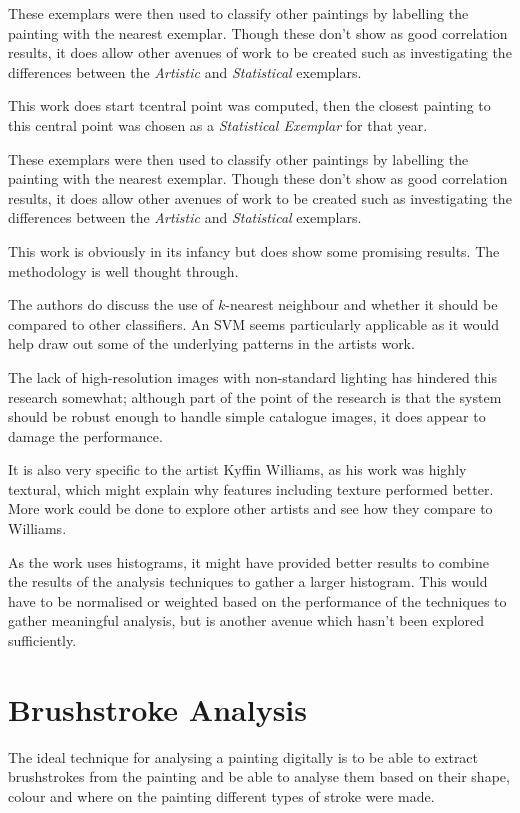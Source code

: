 \documentclass[conference]{IEEEtran}
\begin{document}
These exemplars were then used to classify other paintings by labelling the
painting with the nearest exemplar. Though these don't show as good correlation
results, it does allow other avenues of work to be created such as
investigating the differences between the \emph{Artistic} and
\emph{Statistical} exemplars.

This work does start tcentral point was computed, then the closest painting to
this central point was chosen as a \emph{Statistical Exemplar} for that year.

These exemplars were then used to classify other paintings by labelling the
painting with the nearest exemplar. Though these don't show as good correlation
results, it does allow other avenues of work to be created such as
investigating the differences between the \emph{Artistic} and
\emph{Statistical} exemplars.

This work is obviously in its infancy but does show some promising results. The
methodology is well thought through.

The authors do discuss the use of $k$-nearest neighbour and whether it should
be compared to other classifiers. An \gls{SVM} seems particularly applicable as
it would help draw out some of the underlying patterns in the artists work.

The lack of high-resolution images with non-standard lighting has hindered this
research somewhat; although part of the point of the research is that the
system should be robust enough to handle simple catalogue images, it does
appear to damage the performance.

It is also very specific to the artist Kyffin Williams, as his work was highly
textural, which might explain why features including texture performed better.
More work could be done to explore other artists and see how they compare to
Williams.

As the work uses histograms, it might have provided better results to combine
the results of the analysis techniques to gather a larger histogram. This would
have to be normalised or weighted based on the performance of the techniques to
gather meaningful analysis, but is another avenue which hasn't been explored
sufficiently.

\section{Brushstroke Analysis}

The ideal technique for analysing a painting digitally is to be able to extract
brushstrokes from the painting and be able to analyse them based on their
shape, colour and where on the painting different types of stroke were made.
\end{document}

